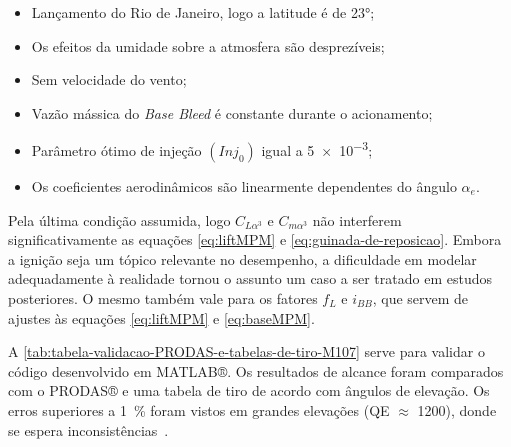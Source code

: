 \begin{itemize}
    \item Lançamento do Rio de Janeiro, logo a latitude é de \ang{23};
    \item Os efeitos da umidade sobre a atmosfera são desprezíveis;
    \item Sem velocidade do vento;
    \item Vazão mássica do \textit{Base Bleed} é constante durante o acionamento;
    \item Parâmetro ótimo de injeção \(\left(Inj_{0}\right)\) igual a \num{5e-3};
    \item Os coeficientes aerodinâmicos são linearmente dependentes do ângulo \(\alpha_{e}\).
\end{itemize}

Pela última condição assumida, logo \(C_{L\alpha^{3}}\) e \(C_{m\alpha^{3}}\) não interferem significativamente as equações \ref{eq:liftMPM} e \ref{eq:guinada-de-reposicao}. Embora a ignição seja um tópico relevante no desempenho, a dificuldade em modelar adequadamente à realidade tornou o assunto um caso a ser tratado em estudos posteriores. O mesmo também vale para os fatores \(f_{L}\) e \(i_{BB}\), que servem de ajustes às equações \ref{eq:liftMPM} e \ref{eq:baseMPM}.

A \autoref{tab:tabela-validacao-PRODAS-e-tabelas-de-tiro-M107} serve para validar o código desenvolvido em MATLAB®. Os resultados de alcance foram comparados com o PRODAS® e uma tabela de tiro de acordo com ângulos de elevação. Os erros superiores a \qty{1}{\percent} foram vistos em grandes elevações (QE \(\approx\) \qty{1200}{\milliradian}), donde se espera inconsistências~\cite{McCoy2012,Carlucci2018}.

